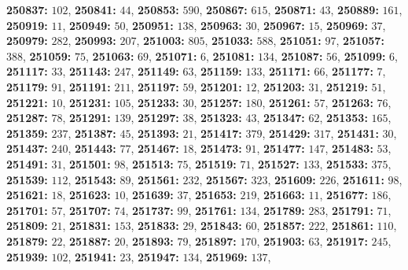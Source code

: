 \textsf{\bfseries 250837:} $102$, \textsf{\bfseries 250841:} $44$, \textsf{\bfseries 250853:} $590$, \textsf{\bfseries 250867:} $615$, \textsf{\bfseries 250871:} $43$, \textsf{\bfseries 250889:} $161$, \textsf{\bfseries 250919:} $11$, \textsf{\bfseries 250949:} $50$, \textsf{\bfseries 250951:} $138$, \textsf{\bfseries 250963:} $30$, \textsf{\bfseries 250967:} $15$, \textsf{\bfseries 250969:} $37$, \textsf{\bfseries 250979:} $282$, \textsf{\bfseries 250993:} $207$, \textsf{\bfseries 251003:} $805$, \textsf{\bfseries 251033:} $588$, \textsf{\bfseries 251051:} $97$, \textsf{\bfseries 251057:} $388$, \textsf{\bfseries 251059:} $75$, \textsf{\bfseries 251063:} $69$, \textsf{\bfseries 251071:} $6$, \textsf{\bfseries 251081:} $134$, \textsf{\bfseries 251087:} $56$, \textsf{\bfseries 251099:} $6$, \textsf{\bfseries 251117:} $33$, \textsf{\bfseries 251143:} $247$, \textsf{\bfseries 251149:} $63$, \textsf{\bfseries 251159:} $133$, \textsf{\bfseries 251171:} $66$, \textsf{\bfseries 251177:} $7$, \textsf{\bfseries 251179:} $91$, \textsf{\bfseries 251191:} $211$, \textsf{\bfseries 251197:} $59$, \textsf{\bfseries 251201:} $12$, \textsf{\bfseries 251203:} $31$, \textsf{\bfseries 251219:} $51$, \textsf{\bfseries 251221:} $10$, \textsf{\bfseries 251231:} $105$, \textsf{\bfseries 251233:} $30$, \textsf{\bfseries 251257:} $180$, \textsf{\bfseries 251261:} $57$, \textsf{\bfseries 251263:} $76$, \textsf{\bfseries 251287:} $78$, \textsf{\bfseries 251291:} $139$, \textsf{\bfseries 251297:} $38$, \textsf{\bfseries 251323:} $43$, \textsf{\bfseries 251347:} $62$, \textsf{\bfseries 251353:} $165$, \textsf{\bfseries 251359:} $237$, \textsf{\bfseries 251387:} $45$, \textsf{\bfseries 251393:} $21$, \textsf{\bfseries 251417:} $379$, \textsf{\bfseries 251429:} $317$, \textsf{\bfseries 251431:} $30$, \textsf{\bfseries 251437:} $240$, \textsf{\bfseries 251443:} $77$, \textsf{\bfseries 251467:} $18$, \textsf{\bfseries 251473:} $91$, \textsf{\bfseries 251477:} $147$, \textsf{\bfseries 251483:} $53$, \textsf{\bfseries 251491:} $31$, \textsf{\bfseries 251501:} $98$, \textsf{\bfseries 251513:} $75$, \textsf{\bfseries 251519:} $71$, \textsf{\bfseries 251527:} $133$, \textsf{\bfseries 251533:} $375$, \textsf{\bfseries 251539:} $112$, \textsf{\bfseries 251543:} $89$, \textsf{\bfseries 251561:} $232$, \textsf{\bfseries 251567:} $323$, \textsf{\bfseries 251609:} $226$, \textsf{\bfseries 251611:} $98$, \textsf{\bfseries 251621:} $18$, \textsf{\bfseries 251623:} $10$, \textsf{\bfseries 251639:} $37$, \textsf{\bfseries 251653:} $219$, \textsf{\bfseries 251663:} $11$, \textsf{\bfseries 251677:} $186$, \textsf{\bfseries 251701:} $57$, \textsf{\bfseries 251707:} $74$, \textsf{\bfseries 251737:} $99$, \textsf{\bfseries 251761:} $134$, \textsf{\bfseries 251789:} $283$, \textsf{\bfseries 251791:} $71$, \textsf{\bfseries 251809:} $21$, \textsf{\bfseries 251831:} $153$, \textsf{\bfseries 251833:} $29$, \textsf{\bfseries 251843:} $60$, \textsf{\bfseries 251857:} $222$, \textsf{\bfseries 251861:} $110$, \textsf{\bfseries 251879:} $22$, \textsf{\bfseries 251887:} $20$, \textsf{\bfseries 251893:} $79$, \textsf{\bfseries 251897:} $170$, \textsf{\bfseries 251903:} $63$, \textsf{\bfseries 251917:} $245$, \textsf{\bfseries 251939:} $102$, \textsf{\bfseries 251941:} $23$, \textsf{\bfseries 251947:} $134$, \textsf{\bfseries 251969:} $137$, 
